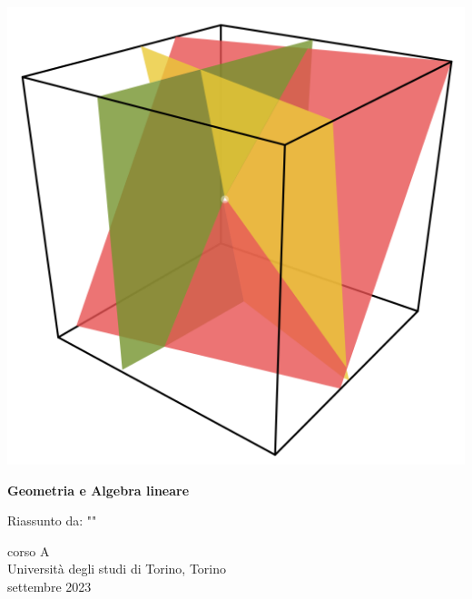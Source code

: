 \begin{titlepage}
   \begin{center}
       \vspace*{1cm}
       \begin{center}
           \includegraphics[scale =0.17]{pngegg.png}
       \end{center}
        \vspace{1.5cm}
       \textbf{\LARGE Geometria e Algebra lineare}

       \vspace{0.5cm}
        Riassunto da: ""


       \vfill
            
       
            
       \vspace{0.8cm}
     
       
            
       corso A\\
       Università degli studi di Torino, Torino\\
       settembre 2023\\
       
            
   \end{center}
\end{titlepage}
